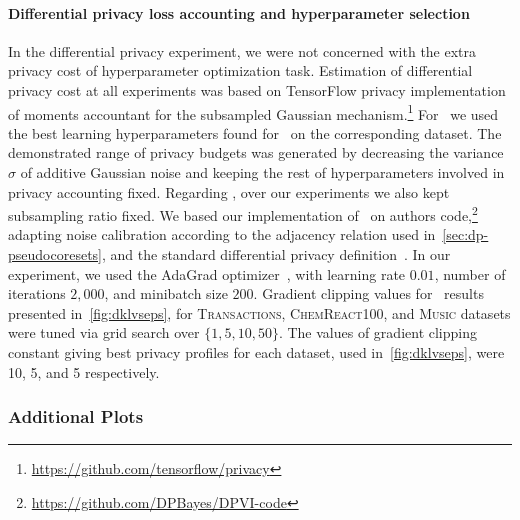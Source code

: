 \paragraph{Differential privacy loss accounting and hyperparameter selection}  In the differential privacy experiment, we were not concerned with the extra privacy cost of hyperparameter optimization task.  Estimation of differential privacy cost at all experiments was based on TensorFlow privacy implementation of moments accountant for the subsampled Gaussian mechanism.\footnote{\href{https://github.com/tensorflow/privacy}{https://github.com/tensorflow/privacy}} 
For \dpsvi~we used the best learning hyperparameters found for \psvi~on the corresponding dataset. The demonstrated range of privacy budgets was generated by decreasing the variance $ \sigma $ of additive Gaussian noise and keeping the rest of hyperparameters involved in privacy accounting fixed.  
Regarding \dpvi, over our experiments we also kept subsampling ratio fixed. We based our implementation of \dpvi~on authors code,\footnote{\href{https://github.com/DPBayes/DPVI-code}{https://github.com/DPBayes/DPVI-code}} adapting noise calibration according to the adjacency relation used in~\cref{sec:dp-pseudocoresets}, and the standard differential privacy definition~\citep{dwork14}. In our experiment, we used the AdaGrad optimizer~\citep{duchi11}, with learning rate $0.01$, number of iterations $2,000$, and minibatch size $200$. Gradient clipping values for \dpvi~results presented in~\cref{fig:dklvseps}, for \textsc{Transactions}, \textsc{ChemReact100}, and \textsc{Music} datasets were tuned via grid search over ${\{1, 5, 10, 50\}}$. The values of gradient clipping constant giving best privacy profiles for each dataset, used in~\cref{fig:dklvseps}, were 10, 5, and 5 respectively. 



\subsubsection{Additional Plots}
\label{app:cpu_timings}

